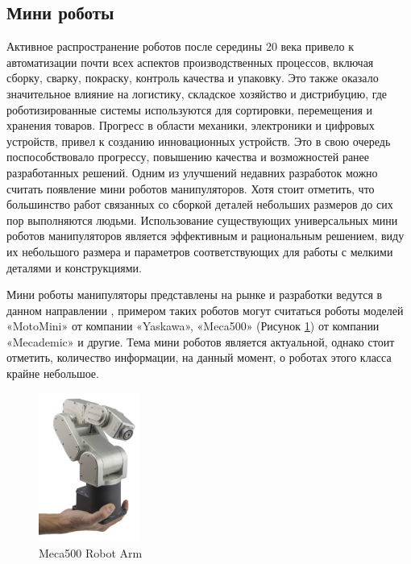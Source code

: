 \subsection{Мини роботы}

Активное распространение роботов после середины 20 века привело к автоматизации почти всех аспектов производственных процессов, включая сборку, сварку, покраску, контроль качества и упаковку. Это также оказало значительное влияние на логистику, складское хозяйство и дистрибуцию, где роботизированные системы используются для сортировки, перемещения и хранения товаров. Прогресс в области механики, электроники и цифровых устройств, привел к созданию инновационных устройств. Это в свою очередь поспособствовало прогрессу, повышению качества и возможностей ранее разработанных решений. Одним из улучшений недавних разработок можно считать появление мини роботов манипуляторов.
Хотя стоит отметить, что большинство работ связанных со сборкой деталей небольших размеров до сих пор выполняются людьми. Использование существующих универсальных мини роботов манипуляторов является эффективным и рациональным решением, виду их небольшого размера и параметров соответствующих для работы с мелкими деталями и конструкциями.

Мини роботы манипуляторы представлены на рынке и разработки ведутся в данном направлении \citep{Li2022}, примером таких роботов могут считаться роботы моделей «MotoMini» от компании «Yaskawa», «Meca500» (Рисунок \ref{meca}) от компании «Mecademic»  и другие. Тема мини роботов является актуальной, однако стоит отметить, количество информации, на данный момент, о роботах этого класса крайне небольшое.

\begin{figure}[H]
	\centering
	\includegraphics[width=0.3\textwidth]{Src/images/Meca500.jpg}
	\caption{Meca500 Robot Arm}
	\label{meca}
\end{figure}

